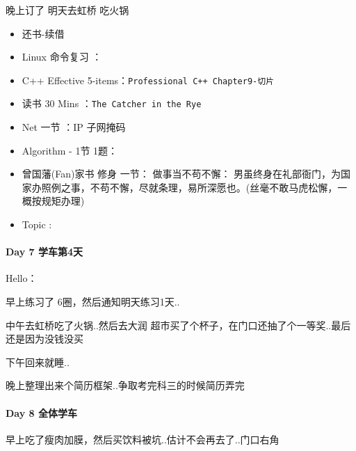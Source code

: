 \documentclass[UTF8,a4paper,8pt]{ctexart}
\begin{document}
	 	 晚上订了 明天去虹桥 吃火锅
	 	 \begin{itemize}[itemindent = 1em]
	 	 	\renewcommand\labelitemi{\makebox[0pt][l]{$\square$}\hspace{1em}} 
	 	 	\renewcommand\labelitemi{\makebox[0pt][l]{$\square$}\raisebox{.15ex}{\hspace{0.1em}$\checkmark$}}
	 	 	\item   还书-续借	 	 	
	 	 	\item   Linux 命令复习 ：
	 	 	\item   C++ Effective 5-items：\verb|Professional C++ Chapter9-切片|
	 	 	
	 	 	\item   读书  30 Mins	：\verb|The Catcher in the Rye|	
	 	 	\renewcommand\labelitemi{\makebox[0pt][l]{$\square$}\hspace{1em}} 
	 	 	\item   Net 一节 ：IP 子网掩码	
	 	 	\item   Algorithm - 1节 1题：
	 	 	
	 	 	\renewcommand\labelitemi{\makebox[0pt][l]{$\square$}\raisebox{.15ex}{\hspace{0.1em}$\checkmark$}}
	 	 	\item  曾国藩(Fan)家书 修身 一节： 做事当不苟不懈： 男虽终身在礼部衙门，为国家办照例之事，不苟不懈，尽就条理，易所深愿也。(丝毫不敢马虎松懈，一概按规矩办理)
	 	 	\item   Topic : 
	 	 \end{itemize}
 	 \paragraph{Day 7  学车第4天     \quad     }Hello：
	 	 
		 早上练习了 6圈，然后通知明天练习1天..
		 
		 中午去虹桥吃了火锅..然后去大润 超市买了个杯子，在门口还抽了个一等奖..最后还是因为没钱没买
		 
		 下午回来就睡..
	 	 
	 	 晚上整理出来个简历框架..争取考完科三的时候简历弄完
 	 \paragraph{Day 8  全体学车     \quad     }
	 	 
	 	 早上吃了瘦肉加膜，然后买饮料被坑..估计不会再去了..门口右角
	 	 
\end{document}

